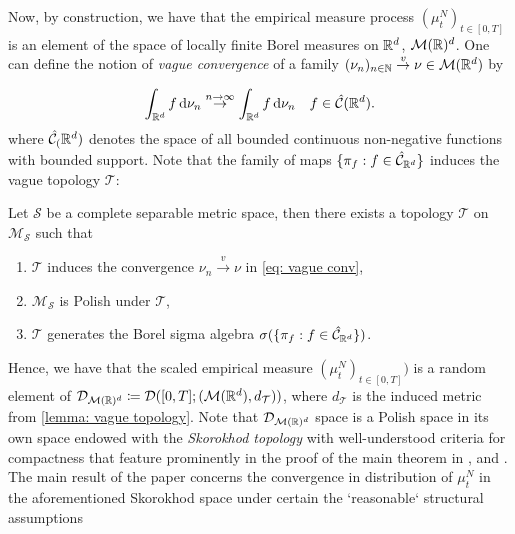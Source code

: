 \documentclass{article}
\begin{document}
Now, by construction, we have that the empirical measure process $ (\mu^{N}_{t})_{t\in [0,T]}$ is an element of the space of locally finite Borel measures on $ \mathbb{R}^{d}$, $ \mathcal{M}(\mathbb{R})^{d}$. One can define the notion of \textit{vague convergence} of a family $ (\nu_{n})_{n\in \mathbb{N}} \stackrel{v}{\to} \nu\in \mathcal{M}(\mathbb{R}^{d})$ by 

\begin{equation}\label{eq: vague conv}
	\int_{\mathbb{R}^{d}}f \operatorname{d}\! \nu_{n}\stackrel{n\to \infty}{\to} \int_{\mathbb{R}^{d}}f \operatorname{d}\! \nu_{n} \quad  f\in \hat{\mathcal{C}}(\mathbb{R}^{d}).
\end{equation}
where $ \hat{\mathcal{C}}_(\mathbb{R}^{d})$ denotes the space of all bounded continuous non-negative functions with bounded support. Note that the family of maps $\{\pi_{f}:f\in \hat {\mathcal{C}}_{\mathbb{R}^{d}}\} $ induces the vague topology $ \mathcal{T}$: 

\begin{boxlemma}\label{lemma: vague topology}
Let $  \mathcal{S}$ be a complete separable metric space, then there exists a topology $  \mathcal{T}$ on $  \mathcal{M}_{ \mathcal{ S}}$ such that
\begin{enumerate}
\item $ \mathcal{T}$ induces the convergence $ \nu_{n}\stackrel{v}{\longrightarrow}\nu$ in \ref{eq: vague conv},
\item $ \mathcal{M}_{ \mathcal{S}}$ is Polish under $  \mathcal{T}$,
\item $  \mathcal{T}$ generates the Borel sigma algebra $\sigma(\{\pi_{f}:f\in \hat {\mathcal{C}}_{\mathbb{R}^{d}}\})$.
\end{enumerate}

\end{boxlemma}

Hence, we have that the scaled empirical measure $ (\mu^{N}_{t})_{t\in [0,T]})$ is a random element of $ \mathcal{D}_{ \mathcal{M}(\mathbb{R})^{d}} \coloneqq \mathcal{D}([0,T]; ( \mathcal{M}(\mathbb{R}^{d}), d_\mathcal{T}))$, where $d_ \mathcal{T}$ is the induced metric from \ref{lemma: vague topology}. Note that $  \mathcal{D}_{ \mathcal{M}(\mathbb{R})^{d}}$ space is a Polish space in its own space endowed with the \textit{Skorokhod topology} with well-understood criteria for compactness that feature prominently in the proof of the main theorem in \cite{sirignano2019meanfieldanalysislln}, and \cite{sirignano2019meanfieldanalysisclt}.\\

The main result of the paper \cite{sirignano2019meanfieldanalysislln} concerns the convergence in distribution of $ \mu^{N}_{t}$ in the aforementioned Skorokhod space under certain the `reasonable` structural assumptions
\end{document}

